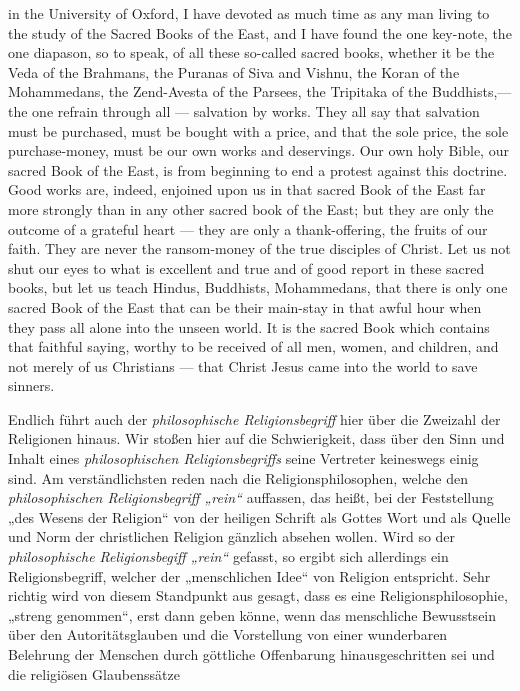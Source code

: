 in the University of Oxford, I have devoted as much time as any man living to the study of the Sacred Books of the East, and I have found the one key-note, the one diapason, so to speak, of all these so-called sacred books, whether it be the Veda of the Brahmans, the Puranas of Siva and Vishnu, the Koran of the Mohammedans, the Zend-Avesta of the Parsees, the Tripitaka of the Buddhists,— the one refrain through all — salvation by works. They all say that salvation must be purchased, must be bought with a price, and that the sole price, the sole purchase-money, must be our own works and deservings. Our own holy Bible, our sacred Book of the East, is from beginning to end a protest against this doctrine. Good works are, indeed, enjoined upon us in that sacred Book of the East far more strongly than in any other sacred book of the East; but they are only the outcome of a grateful heart — they are only a thank-offering, the fruits of our faith. They are never the ransom-money of the true disciples of Christ. Let us not shut our eyes to what is excellent and true and of good report in these sacred books, but let us teach Hindus, Buddhists, Mohammedans, that there is only one sacred Book of the East that can be their main-stay in that awful hour when they pass all alone into the unseen world. It is the sacred Book which contains that faithful saying, worthy to be received of all men, women, and children, and not merely of us Christians — that Christ Jesus came into the world to save sinners.

Endlich führt auch der \textit{philosophische Religionsbegriff} hier über die Zweizahl der Religionen hinaus. Wir stoßen hier auf die Schwierigkeit, dass über den Sinn und Inhalt eines \textit{philosophischen Religionsbegriffs} seine Vertreter keineswegs einig sind. Am verständlichsten reden nach die Religionsphilosophen, welche den \textit{philosophischen Religionsbegriff „rein“} auffassen, das heißt, bei der Feststellung „des Wesens der Religion“ von der heiligen Schrift als Gottes Wort und als Quelle und Norm der christlichen Religion gänzlich absehen wollen. Wird so der \textit{philosophische Religionsbegiff „rein“} gefasst, so ergibt sich allerdings ein Religionsbegriff, welcher der „menschlichen Idee“ von Religion entspricht. Sehr richtig wird von diesem Standpunkt aus gesagt, dass es eine Religionsphilosophie, „streng genommen“, erst dann geben könne, wenn das menschliche Bewusstsein über den Autoritätsglauben und die Vorstellung von einer wunderbaren Belehrung der Menschen durch göttliche Offenbarung hinausgeschritten sei und die religiösen Glaubenssätze